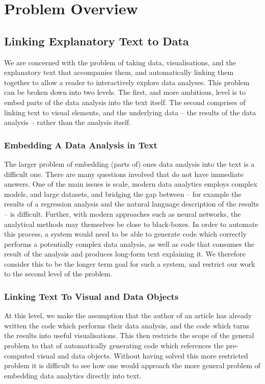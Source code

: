 \section{Problem Overview}
\label{sec:overview}

\subsection{Linking Explanatory Text to Data}
We are concerned with the problem of taking data, visualisations, and the explanatory text
that accompanies them, and automatically linking them together to allow a reader to interactively explore
data analyses. This problem can be broken down into two levels. The first, and more ambitious, level
is to embed parts of the data analysis into the text itself. The second comprises of linking text
to visual elements, and the underlying data -- the results of the data analysis -- rather than the
analysis itself.


\subsubsection{Embedding A Data Analysis in Text}
The larger problem of embedding (parts of) ones data analysis into the text is a difficult one. There
are many questions involved that do not have immediate answers. One of the main issues is scale, 
modern data analytics employs complex models, and large datasets, and bridging the gap between -- for example
the results of a regression analysis and the natural language description of the results -- is difficult. 
Further, with modern approaches such as neural networks, the analytical methods may themselves be close
to black-boxes.
In order to automate this process, a system would need to be able to generate code which correctly performs
a potentially complex data analysis, as well as code that consumes the result of the analysis and produces
long-form text explaining it. We therefore consider this to be the longer term goal for such a system, 
and restrict our work to the second level of the problem.

\subsubsection{Linking Text To Visual and Data Objects}
At this level, we make the assumption that the author of an article has already written the code which performs
their data analysis, and the code which turns the results into useful visualisations. This then restricts the
scope of the general problem to that of automatically generating code which references the pre-computed visual
and data objects. Without having solved this more restricted problem it is difficult to see how one would approach
the more general problem of embedding data analytics directly into text.


